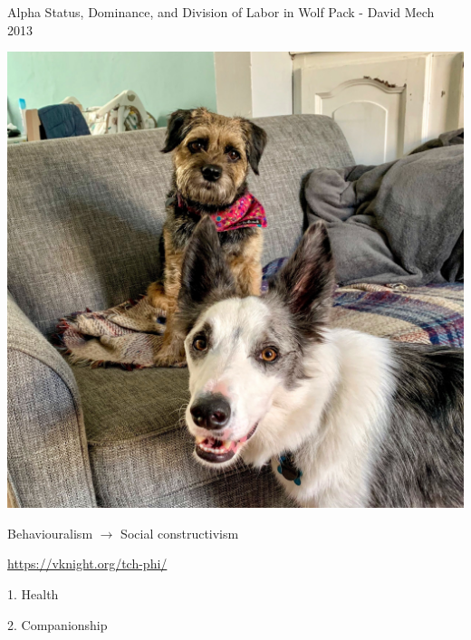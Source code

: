 \documentclass{beamer}
\begin{document}
    \begin{frame}
        \centering
        \huge
    Alpha Status, Dominance, and Division of Labor in Wolf Pack - David Mech
    2013
    \end{frame}

    \begin{frame}
        \centering
        \includegraphics[height=.95\textheight]{static/tobi_and_riggs.jpg}
    \end{frame}


    \begin{frame}
        \centering 
        \LARGE
        
        Behaviouralism \(\to\) Social constructivism

        \vspace{1cm}
        \large
        \url{https://vknight.org/tch-phi/}
    \end{frame}

    \begin{frame}
        \centering
        \Huge
        1. Health
    \end{frame}

    \begin{frame}
        \centering
        \Huge
        2. Companionship
    \end{frame}
\end{document}
